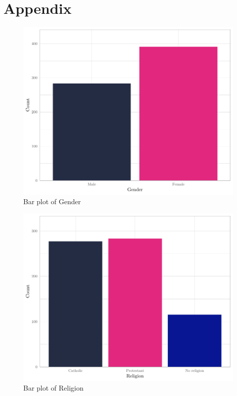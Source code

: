 \documentclass[
]{article}
\begin{document}
\pagebreak

\hypertarget{appendix}{%
\section{Appendix}\label{appendix}}

\begin{figure}[H]

{\centering \includegraphics[width=0.8\linewidth]{paper_files/figure-latex/unnamed-chunk-6-1} 

}

\caption{Bar plot of Gender}\label{fig:unnamed-chunk-6}
\end{figure}

\begin{figure}[H]

{\centering \includegraphics[width=0.8\linewidth]{paper_files/figure-latex/unnamed-chunk-7-1} 

}

\caption{Bar plot of Religion}\label{fig:unnamed-chunk-7}
\end{figure}
\end{document}
